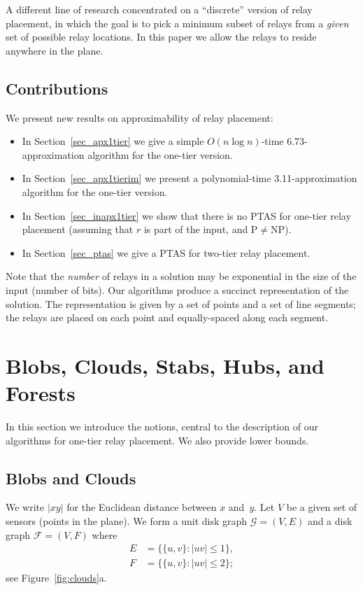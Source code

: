 \documentclass[11pt,a4paper]{article}
\newcommand{\myd}[2]{\lvert #1 #2 \rvert}
\newcommand{\myF}{\mathcal{F}}
\newcommand{\myG}{\mathcal{G}}
\theoremstyle{definition}
\theoremstyle{remark}
\begin{document}
A different line of research \cite{misra08constrained,carmi07covering} concentrated on a ``discrete'' version of relay placement, in which the goal is to pick a minimum subset of relays from a \emph{given} set of possible relay locations.  In this paper we allow the relays to reside anywhere in the plane.

\subsection{Contributions}

We present new results on approximability of relay placement:
\begin{itemize}[itemsep=0.5ex]
    \item In Section~\ref{sec_apx1tier} we give a simple $O(n\log n)$-time 6.73-approximation algorithm for the one-tier version.
    \item In Section~\ref{sec_apx1tierim} we present a polynomial-time 3.11-approximation algorithm for the one-tier version.
    \item In Section~\ref{sec_inapx1tier} we show that there is no PTAS for one-tier relay placement (assuming that $r$ is part of the input, and P${}\ne{}$NP).
    \item In Section~\ref{sec_ptas} we give a PTAS for two-tier relay placement.
\end{itemize}
Note that the \emph{number} of relays in a solution may be exponential in the size of the input (number of bits).  Our algorithms produce a succinct representation of the solution.  The representation is given by a set of points and a set of line segments; the relays are placed on each point and equally-spaced along each segment.



\section{Blobs, Clouds, Stabs, Hubs, and Forests}\label{sec_prelim}

In this section we introduce the notions, central to the description of our algorithms for one-tier relay placement.  We also provide lower bounds.

\subsection{Blobs and Clouds}

We write $\myd{x}{y}$ for the Euclidean distance between $x$ and~$y$. Let $V$ be a given set of sensors (points in the plane).  We form a unit disk graph $\myG = (V,E)$ and a disk graph $\myF = (V,F)$ where
\begin{align*}
    E &= \bigl\{ \{u,v\} : \myd{u}{v} \le 1 \bigr\}, \\
    F &= \bigl\{ \{u,v\} : \myd{u}{v} \le 2 \bigr\};
\end{align*}
see Figure~\ref{fig:clouds}a.
\end{document}
